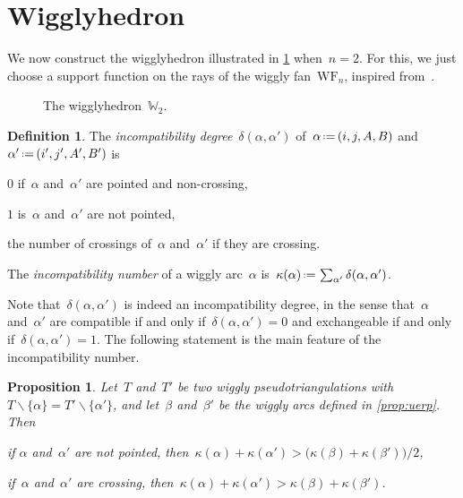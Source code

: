\documentclass[submission]{FPSAC2025}
\newtheorem{proposition}[theorem]{Proposition}
\theoremstyle{definition}
\newtheorem{definition}[theorem]{Definition}
\newcommand{\ssm}{\smallsetminus} %
\newcommand{\eqdef}{\mbox{\,\raisebox{0.2ex}{\scriptsize\ensuremath{\mathrm:}}\ensuremath{=}\,}} %
\newcommand{\ie}{\textit{i.e.}~} %
\newcommand{\darkblue}{\color{darkblue}} %
\newcommand{\defn}[1]{\textsl{\darkblue #1}} %
\newcommand{\polytope}[1]{\mathds{#1}} %
\newcommand{\wigglyFan}{\mathrm{WF}} %
\newcommand{\wigglyhedron}{\polytope{W}} %
\begin{document}
\newpage
\section{Wigglyhedron}
\label{sec:wigglyhedron}

We now construct the wigglyhedron illustrated in \cref{fig:wigglyhedron} when~${n = 2}$.
For this, we just choose a support function on the rays of the wiggly fan~$\wigglyFan_n$, inspired from~\cite{HohlwegPilaudStella,PaluPilaudPlamondon-nonkissing}.
%
\begin{figure}[b]
\centerline{}
\caption{The wigglyhedron~$\wigglyhedron_2$.}
\label{fig:wigglyhedron}
\end{figure}

\begin{definition}
\label{def:incompatibilityDegree}
The \defn{incompatibility degree}~$\delta(\alpha, \alpha')$ of~$\alpha \eqdef (i, j, A, B)$ and~$\alpha' \eqdef (i', j', A', B')$ is %
\begin{compactitem}
\item $0$ if~$\alpha$ and~$\alpha'$ are pointed and non-crossing,
\item $1$ is~$\alpha$ and~$\alpha'$ are not pointed, %
\item the number of crossings of~$\alpha$ and~$\alpha'$ if they are crossing. %
\end{compactitem}
The \defn{incompatibility number} of a wiggly arc~$\alpha$ is~$\kappa(\alpha) \eqdef \sum_{\alpha'} \delta(\alpha, \alpha')$.
\end{definition}

Note that~$\delta(\alpha, \alpha')$ is indeed an incompatibility degree, in the sense that~$\alpha$ and~$\alpha'$ are compatible if and only if~$\delta(\alpha, \alpha') = 0$ and exchangeable if and only if~$\delta(\alpha, \alpha') = 1$.
The following statement is the main feature of the incompatibility number.

\begin{proposition}
\label{prop:wallCrossingInequalities}
Let~$T$ and~$T'$ be two wiggly pseudotriangulations with~$T \ssm \{\alpha\} = T' \ssm \{\alpha'\}$, and let~$\beta$ and~$\beta'$ be the wiggly arcs defined in \cref{prop:uerp}.
Then
\begin{compactitem}
\item if $\alpha$ and~$\alpha'$ are not pointed, then~$\kappa(\alpha) + \kappa(\alpha') > \big( \kappa(\beta) + \kappa(\beta') \big) / 2$,
\item if~$\alpha$ and~$\alpha'$ are crossing, then~${\kappa(\alpha) + \kappa(\alpha') > \kappa(\beta) + \kappa(\beta')}$.
\end{compactitem}
\end{proposition}
\end{document}
